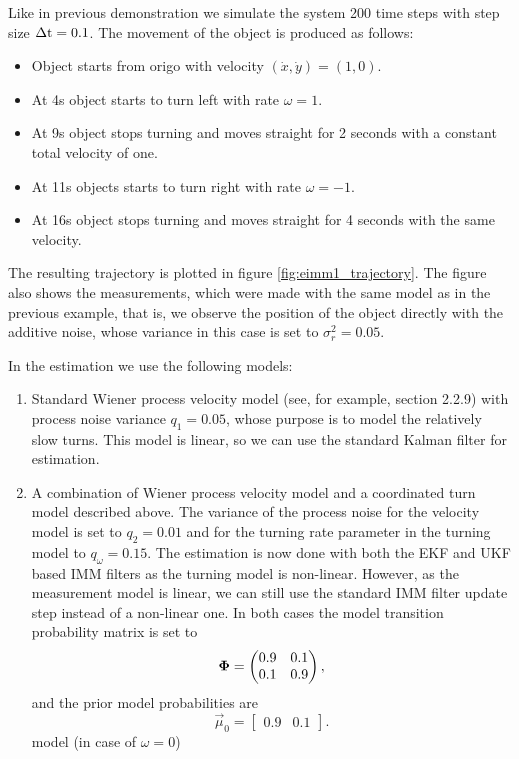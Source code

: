 Like in previous demonstration we simulate the system 200 time steps
with step size $\operatorname{\Delta t} = 0.1$. The movement of the object is produced as
follows:
%
\begin{itemize}
\item Object starts from origo with velocity $(\dot{x},\dot{y}) =
(1,0)$.
\item At 4s object starts to turn left with rate $\omega = 1$.
\item At 9s object stops turning and moves straight for 2 seconds with
a constant total velocity of one.
\item At 11s objects starts to turn right with rate $\omega = -1$.
\item At 16s object stops turning and moves straight for 4 seconds
with the same velocity.
\end{itemize} The resulting trajectory is plotted in figure
\ref{fig:eimm1_trajectory}. The figure also shows the measurements,
which were made with the same model as in the previous example, that
is, we observe the position of the object directly with the additive
noise, whose variance in this case is set to $\sigma^2_r = 0.05$.

In the estimation we use the following models:
%
\begin{enumerate}
\item Standard Wiener process velocity model (see, for example,
section 2.2.9) with process noise variance $q_1 = 0.05$, whose purpose
is to model the relatively slow turns. This model is linear, so we can
use the standard Kalman filter for estimation.
\item A combination of Wiener process velocity model and a coordinated
turn model described above. The variance of the process noise for the
velocity model is set to $q_2 = 0.01$ and for the turning rate
parameter in the turning model to $q_{\omega} = 0.15$. The estimation
is now done with both the EKF and UKF based IMM filters as the turning
model is non-linear. However, as the measurement model is linear, we
can still use the standard IMM filter update step instead of a
non-linear one.  In both cases the model transition probability matrix
is set to
  \begin{equation}
    \mathbf{\Phi} =
    \begin{pmatrix} 0.9 & 0.1 \\ 0.1 & 0.9
    \end{pmatrix}, \label{eq:imm_mtpm}
  \end{equation}
  and the prior model probabilities are
  \begin{equation}
    \vec{\mu}_0 = \begin{bmatrix} 0.9 & 0.1
\end{bmatrix}. \label{eq:imm_modelprior}
  \end{equation}
model (in case of $\omega = 0$)
\end{enumerate}

